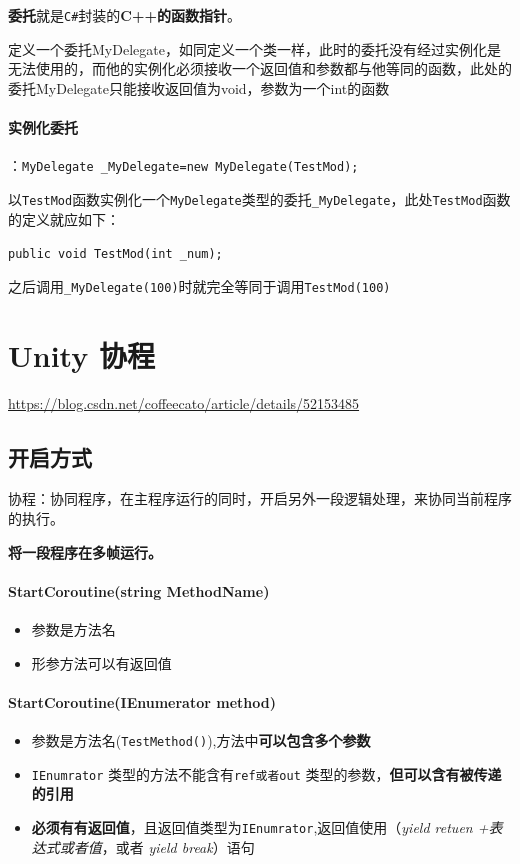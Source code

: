 \documentclass[UTF8,a4paper,12pt]{ctexbook}
\begin{document}
			\textbf{委托}就是\verb|C#|封装的\textbf{C++的函数指针}。
			
			定义一个委托MyDelegate，如同定义一个类一样，此时的委托没有经过实例化是无法使用的，而他的实例化必须接收一个返回值和参数都与他等同的函数，此处的委托MyDelegate只能接收返回值为void，参数为一个int的函数
			
		\paragraph{实例化委托}：\verb|MyDelegate _MyDelegate=new MyDelegate(TestMod);|
			
			以\verb|TestMod|函数实例化一个\verb|MyDelegate|类型的委托\verb|_MyDelegate|，此处\verb|TestMod|函数的定义就应如下：
				
			\verb|public void TestMod(int _num);|
				
			之后调用\verb|_MyDelegate(100)|时就完全等同于调用\verb|TestMod(100)|
		
		
		
	\section{Unity 协程}
		\url{https://blog.csdn.net/coffeecato/article/details/52153485}
		\subsection{开启方式}
			协程：协同程序，在主程序运行的同时，开启另外一段逻辑处理，来协同当前程序的执行。
			
			\textbf{将一段程序在多帧运行。}
			
			\paragraph{StartCoroutine(string MethodName)}
				\begin{itemize}
					\item 参数是方法名					
					\item 形参方法可以有返回值
				\end{itemize}
			
			\paragraph{StartCoroutine(IEnumerator method)}
				\begin{itemize}
					\item 参数是方法名(\verb|TestMethod()|),方法中\textbf{可以包含多个参数}
					\item \verb|IEnumrator| 类型的方法不能含有\verb|ref或者out| 类型的参数，\textbf{但可以含有被传递的引用}
					\item \textbf{必须有有返回值}，且返回值类型为\verb|IEnumrator|,返回值使用（\textit{yield retuen +表达式或者值}，或者 \textit{yield break}）语句	
			\end{itemize}
		
\end{document}
